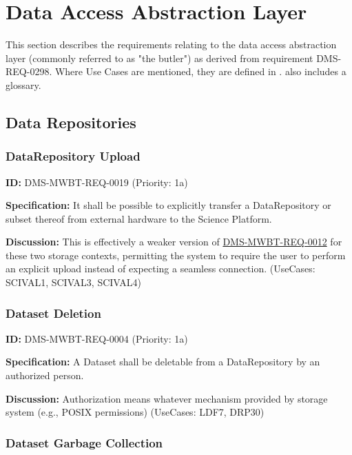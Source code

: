 \documentclass[SE,toc,lsstdraft]{lsstdoc}
\date{2018-01-12}
\begin{document}
\maketitle

\section{Data Access Abstraction Layer}

This section describes the requirements relating to the data access abstraction layer (commonly referred to as "the butler") as derived from requirement DMS-REQ-0298. Where Use Cases are mentioned, they are defined in .  also includes a glossary.

\subsection{Data Repositories}

\subsubsection{DataRepository Upload}

\label{DMS-MWBT-REQ-0019}
\textbf{ID:} DMS-MWBT-REQ-0019 (Priority: 1a)

\textbf{Specification:}
It shall be possible to explicitly transfer a DataRepository or subset thereof from external hardware to the Science Platform.

\textbf{Discussion:}
This is effectively a weaker version of \hyperref[DMS-MWBT-REQ-0012]{DMS-MWBT-REQ-0012} for these two storage contexts, permitting the system to require the user to perform an explicit upload instead of expecting a seamless connection. (UseCases: SCIVAL1, SCIVAL3, SCIVAL4)

\subsubsection{Dataset Deletion}

\label{DMS-MWBT-REQ-0004}
\textbf{ID:} DMS-MWBT-REQ-0004 (Priority: 1a)

\textbf{Specification:}
A Dataset shall be deletable from a DataRepository by an authorized person.

\textbf{Discussion:}
Authorization means whatever mechanism provided by storage system (e.g., POSIX permissions) (UseCases: LDF7, DRP30)

\subsubsection{Dataset Garbage Collection}
\end{document}
